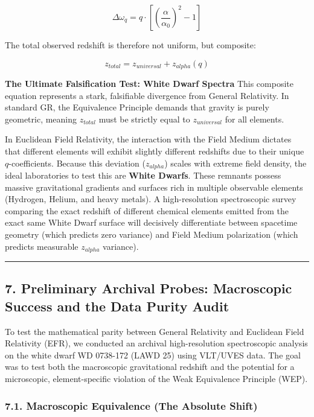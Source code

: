 \documentclass[twocolumn]{article}
\begin{document}
\[\Delta \omega_{q} = q \cdot \left[ \left( \frac{\alpha}{\alpha_0} \right)^2 - 1 \right]\]

The total observed redshift is therefore not uniform, but composite:

\[z_{total} = z_{universal} + z_{alpha}(q)\]

\textbf{The Ultimate Falsification Test: White Dwarf Spectra} This
composite equation represents a stark, falsifiable divergence from
General Relativity. In standard GR, the Equivalence Principle demands
that gravity is purely geometric, meaning \(z_{total}\) must be strictly
equal to \(z_{universal}\) for all elements.

In Euclidean Field Relativity, the interaction with the Field Medium
dictates that different elements will exhibit slightly different
redshifts due to their unique \(q\)-coefficients. Because this deviation
(\(z_{alpha}\)) scales with extreme field density, the ideal
laboratories to test this are \textbf{White Dwarfs}. These remnants
possess massive gravitational gradients and surfaces rich in multiple
observable elements (Hydrogen, Helium, and heavy metals). A
high-resolution spectroscopic survey comparing the exact redshift of
different chemical elements emitted from the exact same White Dwarf
surface will decisively differentiate between spacetime geometry (which
predicts zero variance) and Field Medium polarization (which predicts
measurable \(z_{alpha}\) variance).

\begin{center}\rule{0.5\linewidth}{0.5pt}\end{center}

\subsection{7. Preliminary Archival Probes: Macroscopic Success and the
Data Purity
Audit}\label{preliminary-archival-probes-macroscopic-success-and-the-data-purity-audit}

To test the mathematical parity between General Relativity and Euclidean
Field Relativity (EFR), we conducted an archival high-resolution
spectroscopic analysis on the white dwarf WD 0738-172 (LAWD 25) using
VLT/UVES data. The goal was to test both the macroscopic gravitational
redshift and the potential for a microscopic, element-specific violation
of the Weak Equivalence Principle (WEP).

\subsubsection{7.1. Macroscopic Equivalence (The Absolute
Shift)}\label{macroscopic-equivalence-the-absolute-shift}
\end{document}
